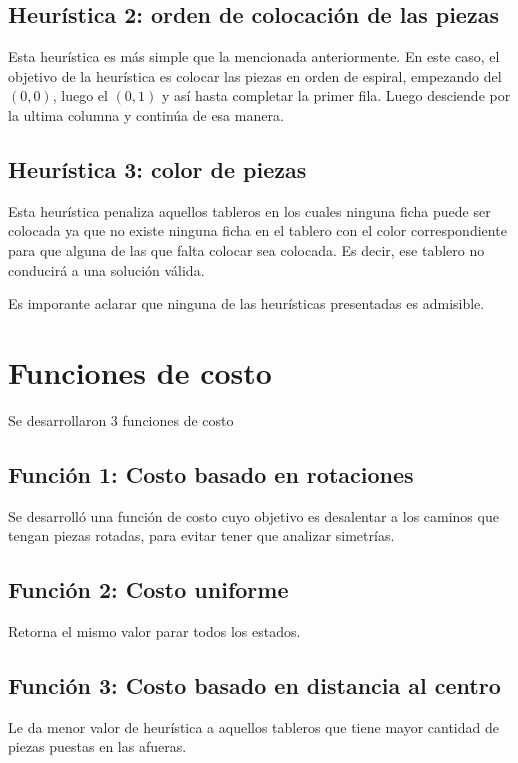 \documentclass[11pt,twocolumn]{article}
\begin{document}
    \subsection{Heurística 2: orden de colocación de las piezas}
    \par Esta heurística es más simple que la mencionada anteriormente. En este caso, el objetivo de la heurística es colocar las piezas en orden de espiral, empezando del $(0,0)$, luego el $(0,1)$ y así hasta completar la primer fila. Luego desciende por la ultima columna y continúa de esa manera.
    \subsection{Heurística 3: color de piezas}
        \par Esta heurística penaliza aquellos tableros en los cuales ninguna ficha puede ser colocada ya que no existe ninguna ficha en el tablero con el color correspondiente para que alguna de las que falta colocar sea colocada. Es decir, ese tablero no conducirá a una solución válida.
        
Es imporante aclarar que ninguna de las heurísticas presentadas es admisible.
    
\section{Funciones de costo}
    \par Se desarrollaron 3 funciones de costo
    \subsection{Función 1: Costo basado en rotaciones}
        \par Se desarrolló una función de costo cuyo objetivo es desalentar a los caminos que tengan piezas rotadas, para evitar tener que analizar simetrías.
    \subsection{Función 2: Costo uniforme}
        \par Retorna el mismo valor parar todos los estados.
    \subsection{Función 3: Costo basado en distancia al centro}
        \par Le da menor valor de heurística a aquellos tableros que tiene mayor cantidad de piezas puestas en las afueras.
\end{document}
